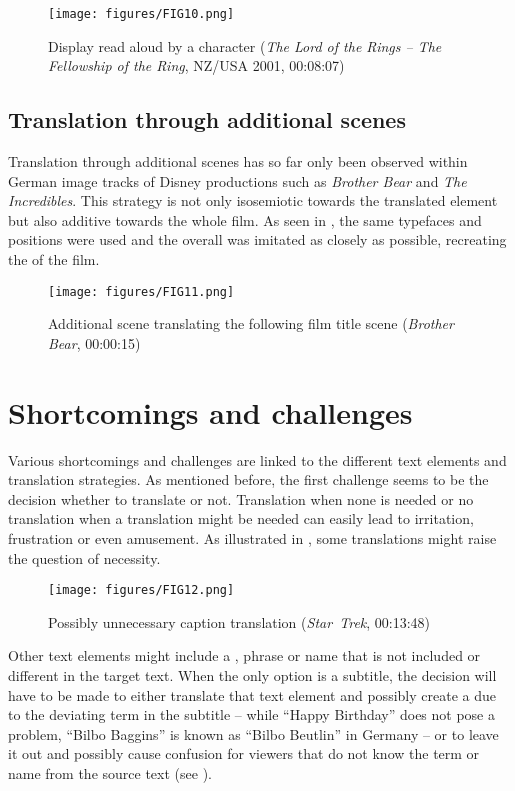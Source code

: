\begin{figure}
\texttt{[image: figures/FIG10.png]}
\caption{Display read aloud by a character (\textit{The Lord of the Rings – The Fellowship of the Ring}, NZ/USA 2001, 00:08:07)}
\label{fig:FIG10}
\end{figure}

\subsection{Translation through additional scenes}\label{sec:2.5.5}

Translation through additional scenes has so far only been observed within German image tracks of Disney productions such as \textit{Brother Bear} and \textit{The Incredibles}. This strategy is not only isosemiotic towards the translated element but also additive towards the whole film. As seen in , the same typefaces and positions were used and the overall  was imitated as closely as possible, recreating the  of the film.

\begin{figure}
\texttt{[image: figures/FIG11.png]}
\caption{Additional scene translating the following film title scene (\textit{Brother Bear}, 00:00:15)}
\label{fig:FIG11}
\end{figure}

\newpage 
\section{Shortcomings and challenges}\label{sec:2.6}

Various shortcomings and challenges are linked to the different text elements and translation strategies. As mentioned before, the first challenge seems to be the decision whether to translate or not. Translation when none is needed or no translation when a translation might be needed can easily lead to irritation, frustration or even amusement. As illustrated in , some translations might raise the question of necessity.

\begin{figure}
\texttt{[image: figures/FIG12.png]}
\caption{Possibly unnecessary caption translation (\textit{Star~Trek}, 00:13:48)}
\label{fig:FIG12}
\end{figure}

Other text elements might include a , phrase or name that is not included or different in the target text. When the only option is a subtitle, the decision will have to be made to either translate that text element and possibly create a  due to the deviating term in the subtitle – while “Happy Birthday” does not pose a problem, “Bilbo Baggins” is known as “Bilbo Beutlin” in Germany – or to leave it out and possibly cause confusion for viewers that do not know the term or name from the source text (see ).

